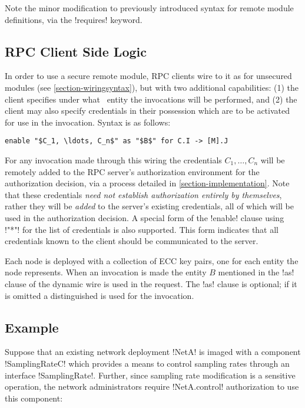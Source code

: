 Note the minor modification to previously introduced syntax for remote module definitions, via
the !requires! keyword.

\subsection{RPC Client Side Logic}
\label{section-rpc-client-side}

In order to use a secure remote module, RPC clients wire to it as for unsecured modules (see
\autoref{section-wiringsyntax}), but with two additional capabilities: (1) the client specifies
under what \RT\ entity the invocations will be performed, and (2) the client may also specify
credentials in their possession which are to be activated for use in the invocation. Syntax is
as follows:
\begin{lstlisting}[mathescape=true]
enable "$C_1, \ldots, C_n$" as "$B$" for C.I -> [M].J
\end{lstlisting}
For any invocation made through this wiring the credentials $C_1, \ldots, C_n$ will be remotely
added to the RPC server's authorization environment for the authorization decision, via a
process detailed in \autoref{section-implementation}. Note that these credentials \emph{need not
  establish authorization entirely by themselves}, rather they will be \emph{added} to the
server's existing credentials, all of which will be used in the authorization decision. A
special form of the !enable! clause using !"*"! for the list of credentials is also supported.
This form indicates that all credentials known to the client should be communicated to the
server.

Each node is deployed with a collection of ECC key pairs, one for each entity the node
represents. When an invocation is made the entity $B$ mentioned in the !as! clause of the
dynamic wire is used in the request. The !as! clause is optional; if it is omitted a
distinguished  is used for the invocation.

\subsection{Example}
\label{section-security-example}

Suppose that an existing network deployment !NetA! is imaged with a component !SamplingRateC!
which provides a means to control sampling rates through an interface !SamplingRate!. Further,
since sampling rate modification is a sensitive operation, the network administrators require
!NetA.control! authorization to use this component:

